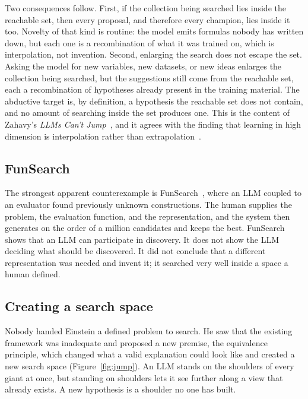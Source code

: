 \documentclass[11pt]{article}
\begin{document}
Two consequences follow. First, if the collection being searched lies inside the reachable set, then
every proposal, and therefore every champion, lies inside it too. Novelty of that kind is routine: the
model emits formulas nobody has written down, but each one is a recombination of what it was trained
on, which is interpolation, not invention. Second, enlarging the search does not escape the set. Asking
the model for new variables, new datasets, or new ideas enlarges the collection being searched, but the
suggestions still come from the reachable set, each a recombination of hypotheses already present in
the training material. The abductive target is, by definition, a hypothesis the reachable set does not
contain, and no amount of searching inside the set produces one. This is the content of Zahavy's
\emph{LLMs Can't Jump}~\cite{zahavy}, and it agrees with the finding that learning in high dimension is
interpolation rather than extrapolation~\cite{lecun}.

\subsection{FunSearch}

The strongest apparent counterexample is FunSearch~\cite{funsearch}, where an LLM coupled to an
evaluator found previously unknown constructions. The human supplies the problem, the evaluation
function, and the representation, and the system then generates on the order of a million candidates
and keeps the best. FunSearch shows that an LLM can participate in discovery. It does not show the
LLM deciding what should be discovered. It did not conclude that a different representation was needed
and invent it; it searched very well inside a space a human defined.

\subsection{Creating a search space}

Nobody handed Einstein a defined problem to search. He saw that the existing framework was inadequate
and proposed a new premise, the equivalence principle, which changed what a valid explanation could
look like and created a new search space (Figure~\ref{fig:jump}). An LLM stands on the shoulders of
every giant at once, but standing on shoulders lets it see further along a view that already exists.
A new hypothesis is a shoulder no one has built.
\end{document}
